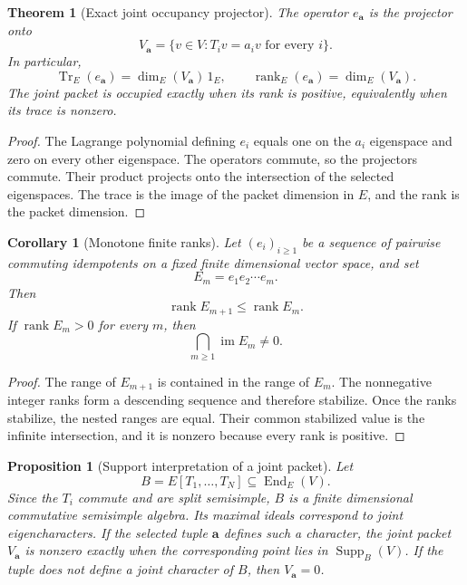 \documentclass{aomart}
\newtheorem{theorem}{Theorem}[section]
\newtheorem{proposition}[proposition]{Proposition}
\newtheorem{corollary}[corollary]{Corollary}
\theoremstyle{definition}
\theoremstyle{remark}
\newcommand{\Supp}{\operatorname{Supp}}
\newcommand{\End}{\operatorname{End}}
\newcommand{\im}{\operatorname{im}}
\newcommand{\rank}{\operatorname{rank}}
\newcommand{\Tr}{\operatorname{Tr}}
\begin{document}
\begin{theorem}[Exact joint occupancy projector]\label{thm:joint_occupancy}
The operator \(e_{\bm a}\) is the projector onto
\[
V_{\bm a}
=
\{v\in V:T_iv=a_iv\text{ for every }i\}.
\]
In particular,
\[
\boxed{
\Tr_E(e_{\bm a})
=
\dim_E(V_{\bm a})\,1_E,
\qquad
\rank_E(e_{\bm a})
=
\dim_E(V_{\bm a}).
}
\]
The joint packet is occupied exactly when its rank is positive, equivalently when its trace is nonzero.
\end{theorem}

\begin{proof}
The Lagrange polynomial defining \(e_i\) equals one on the \(a_i\) eigenspace and zero on every other eigenspace. The operators commute, so the projectors commute. Their product projects onto the intersection of the selected eigenspaces. The trace is the image of the packet dimension in \(E\), and the rank is the packet dimension.
\end{proof}

\begin{corollary}[Monotone finite ranks]\label{cor:monotone_finite_ranks}
Let \((e_i)_{i\geq1}\) be a sequence of pairwise commuting idempotents on a fixed finite dimensional vector space, and set
\[
E_m=e_1e_2\cdots e_m.
\]
Then
\[
\rank E_{m+1}\leq\rank E_m.
\]
If \(\rank E_m>0\) for every \(m\), then
\[
\bigcap_{m\geq1}\im E_m
\neq0.
\]
\end{corollary}

\begin{proof}
The range of \(E_{m+1}\) is contained in the range of \(E_m\). The nonnegative integer ranks form a descending sequence and therefore stabilize. Once the ranks stabilize, the nested ranges are equal. Their common stabilized value is the infinite intersection, and it is nonzero because every rank is positive.
\end{proof}

\begin{proposition}[Support interpretation of a joint packet]\label{prop:support_joint_packet}
Let
\[
B=E[T_1,\ldots,T_N]
\subseteq
\End_E(V).
\]
Since the \(T_i\) commute and are split semisimple, \(B\) is a finite dimensional commutative semisimple algebra. Its maximal ideals correspond to joint eigencharacters. If the selected tuple \(\bm a\) defines such a character, the joint packet \(V_{\bm a}\) is nonzero exactly when the corresponding point lies in \(\Supp_B(V)\). If the tuple does not define a joint character of \(B\), then \(V_{\bm a}=0\).
\end{proposition}
\end{document}
